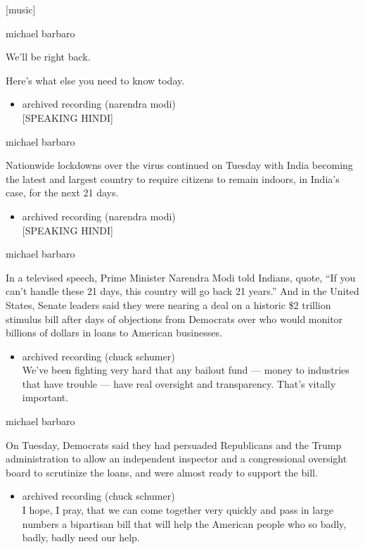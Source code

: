 {[}music{]}

michael barbaro

We'll be right back.

Here's what else you need to know today.

\begin{itemize}
\tightlist
\item
  archived recording (narendra modi)\\
  {[}SPEAKING HINDI{]}
\end{itemize}

michael barbaro

Nationwide lockdowns over the virus continued on Tuesday with India
becoming the latest and largest country to require citizens to remain
indoors, in India's case, for the next 21 days.

\begin{itemize}
\tightlist
\item
  archived recording (narendra modi)\\
  {[}SPEAKING HINDI{]}
\end{itemize}

michael barbaro

In a televised speech, Prime Minister Narendra Modi told Indians, quote,
``If you can't handle these 21 days, this country will go back 21
years.'' And in the United States, Senate leaders said they were nearing
a deal on a historic \$2 trillion stimulus bill after days of objections
from Democrats over who would monitor billions of dollars in loans to
American businesses.

\begin{itemize}
\tightlist
\item
  archived recording (chuck schumer)\\
  We've been fighting very hard that any bailout fund --- money to
  industries that have trouble --- have real oversight and transparency.
  That's vitally important.
\end{itemize}

michael barbaro

On Tuesday, Democrats said they had persuaded Republicans and the Trump
administration to allow an independent inspector and a congressional
oversight board to scrutinize the loans, and were almost ready to
support the bill.

\begin{itemize}
\tightlist
\item
  archived recording (chuck schumer)\\
  I hope, I pray, that we can come together very quickly and pass in
  large numbers a bipartisan bill that will help the American people who
  so badly, badly, badly need our help.
\end{itemize}

